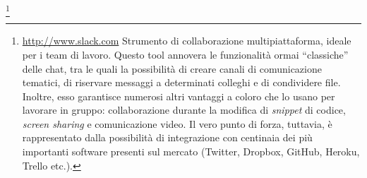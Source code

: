 \footnote{\url{http://www.slack.com} Strumento di collaborazione multipiattaforma, ideale per i team di lavoro. Questo tool annovera le funzionalità
ormai “classiche” delle chat, tra le quali la possibilità di creare canali di comunicazione tematici, di riservare messaggi a determinati colleghi e
di condividere file. Inoltre, esso garantisce numerosi altri vantaggi a coloro che lo usano per lavorare in gruppo: collaborazione durante la modifica
di \emph{snippet} di codice, \emph{screen sharing} e comunicazione video. Il vero punto di forza, tuttavia, è rappresentato dalla possibilità di
integrazione con centinaia dei più importanti software presenti sul mercato (Twitter, Dropbox, GitHub, Heroku, Trello etc.).}
